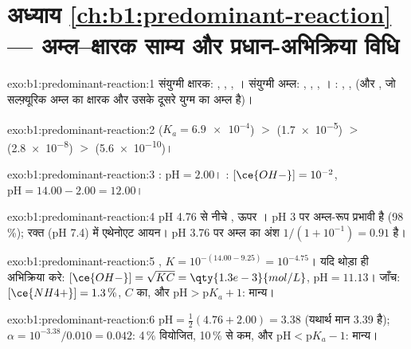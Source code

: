 \section*{अध्याय \ref{ch:b1:predominant-reaction} --- अम्ल--क्षारक साम्य और प्रधान-अभिक्रिया विधि}

\begin{solution}{exo:b1:predominant-reaction:1}
संयुग्मी क्षारक: , , , । संयुग्मी
अम्ल: , , , । : ,
,  (और , जो सल्फ़्यूरिक अम्ल का क्षारक और
उसके दूसरे युग्म का अम्ल है)।
\end{solution}

\begin{solution}{exo:b1:predominant-reaction:2}
 ($K_a = \num{6.9e-4}$) $>$  (\num{1.7e-5}) $>$ 
(\num{2.8e-8}) $>$  (\num{5.6e-10})।
\end{solution}

\begin{solution}{exo:b1:predominant-reaction:3}
: $\mathrm{pH} = 2.00$। : $[\ce{OH-}] = 10^{-2}$,
$\mathrm{pH} = 14.00 - 2.00 = 12.00$।
\end{solution}

\begin{solution}{exo:b1:predominant-reaction:4}
pH 4.76 से नीचे , ऊपर । pH 3 पर अम्ल-रूप
प्रभावी है (98\,\%); रक्त (pH 7.4) में एथेनोएट आयन। pH 3.76 पर
अम्ल का अंश $1/(1 + 10^{-1}) = 0.91$ है।
\end{solution}

\begin{solution}{exo:b1:predominant-reaction:5}
 , $K = 10^{-(14.00 -
9.25)} = 10^{-4.75}$। यदि थोड़ा ही  अभिक्रिया करे: $[\ce{OH-}] = \sqrt{K C} =
\qty{1.3e-3}{mol/L}$, $\mathrm{pH} = 11.13$। जाँच: $[\ce{NH4+}] = 1.3\,\%$, $C$ का,
और $\mathrm{pH} > \mathrm{p}K_a + 1$: मान्य।
\end{solution}

\begin{solution}{exo:b1:predominant-reaction:6}
$\mathrm{pH} = \frac12(4.76 + 2.00) = 3.38$ (यथार्थ मान 3.39 है);
$\alpha = 10^{-3.38}/0.010 = 0.042$: 4\,\% वियोजित, 10\,\% से कम, और
$\mathrm{pH} < \mathrm{p}K_a - 1$: मान्य।
\end{solution}

